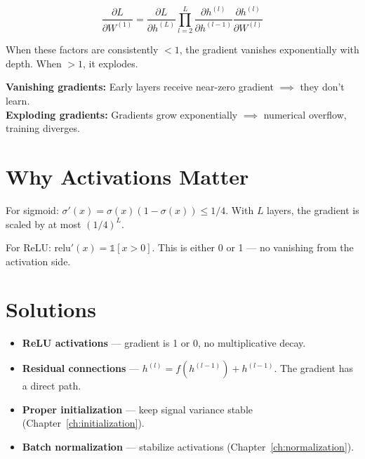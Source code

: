 \documentclass[11pt,a4paper]{book}
\begin{document}
\begin{equation}
    \frac{\partial L}{\partial W^{(1)}} = \frac{\partial L}{\partial h^{(L)}} \prod_{l=2}^{L} \frac{\partial h^{(l)}}{\partial h^{(l-1)}} \frac{\partial h^{(l)}}{\partial W^{(l)}}
\end{equation}

When these factors are consistently $< 1$, the gradient vanishes exponentially with depth. When $> 1$, it explodes.

\begin{boxwarning}{}
\textbf{Vanishing gradients:} Early layers receive near-zero gradient $\implies$ they don't learn.\\
\textbf{Exploding gradients:} Gradients grow exponentially $\implies$ numerical overflow, training diverges.
\end{boxwarning}

\section{Why Activations Matter}

For sigmoid: $\sigma'(x) = \sigma(x)(1-\sigma(x)) \leq 1/4$. With $L$ layers, the gradient is scaled by at most $(1/4)^L$.

For ReLU: $\text{relu}'(x) = \mathbb{1}[x > 0]$. This is either 0 or 1 --- no vanishing from the activation side.

\section{Solutions}

\begin{itemize}[leftmargin=*]
    \item \textbf{ReLU activations} --- gradient is 1 or 0, no multiplicative decay.
    \item \textbf{Residual connections} --- $h^{(l)} = f(h^{(l-1)}) + h^{(l-1)}$. The gradient has a direct path.
    \item \textbf{Proper initialization} --- keep signal variance stable (Chapter~\ref{ch:initialization}).
    \item \textbf{Batch normalization} --- stabilize activations (Chapter~\ref{ch:normalization}).
\end{itemize}

\clearpage

\end{document}
